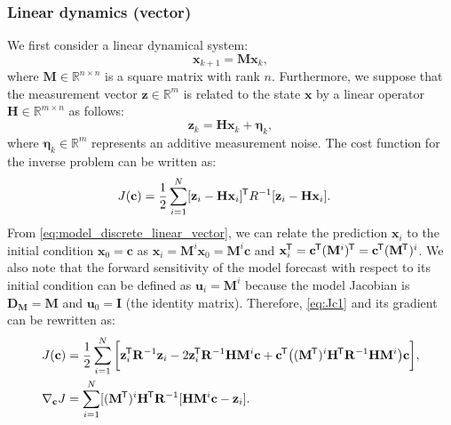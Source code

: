 \documentclass{article}
\newcommand*{\tran}{^{\mkern-1.5mu\mathsf{T}}}
\begin{document}
\subsubsection{Linear dynamics (vector)}
\textcolor{rev}{We first consider a linear dynamical system:
\begin{equation}
    \mathbf{x}_{k+1} = \mathbf{M} \mathbf{x}_k, \label{eq:model_discrete_linear_vector}
\end{equation}
where $\mathbf{M}\in \mathbb{R}^{n\times n}$ is a square matrix with rank $n$. Furthermore, we suppose that the measurement vector $\mathbf{z}\in \mathbb{R}^m$ is related to the state $\mathbf{x}$ by a linear operator $\mathbf{H}\in \mathbb{R}^{m\times n}$ as follows:
\begin{equation}
    \mathbf{z}_k = \mathbf{H} \mathbf{x}_k + \boldsymbol{\eta}_k,
\end{equation}
where $ \boldsymbol{\eta}_k \in \mathbb{R}^m$ represents an additive measurement noise. The cost function for the inverse problem can be written as:
\begin{equation}
    \begin{aligned}
        J(\mathbf{c}) &= \dfrac{1}{2} \sum_{i=1}^{N} [\mathbf{z}_i-\mathbf{H} \mathbf{x}_i]\tran R^{-1} [\mathbf{z}_i-\mathbf{H} \mathbf{x}_i].
    \end{aligned} \label{eq:Jc1}
\end{equation}
From \cref{eq:model_discrete_linear_vector}, we can relate the prediction $\mathbf{x}_i$ to the initial condition $\mathbf{x}_0=\mathbf{c}$ as $\mathbf{x}_i = \mathbf{M}^i \mathbf{x}_0= \mathbf{M}^i \mathbf{c}$ and $\mathbf{x}_i\tran =\mathbf{c}\tran (\mathbf{M}^i)\tran = \mathbf{c}\tran (\mathbf{M}\tran)^i$. We also note that the forward sensitivity of the model forecast with respect to its initial condition can be defined as $\mathbf{u}_i = \mathbf{M}^i$ because the model Jacobian is $\mathbf{D}_{\mathbf{M}}=\mathbf{M}$ and $\mathbf{u}_0=\mathbf{I}$ (the identity matrix). Therefore, \cref{eq:Jc1} and its gradient can be rewritten as:
\begin{align}
    J(\mathbf{c}) &= \dfrac{1}{2} \sum_{i=1}^{N} \bigg[\mathbf{z}_i\tran \mathbf{R}^{-1} \mathbf{z}_i - 2 \mathbf{z}_i\tran \mathbf{R}^{-1} \mathbf{H} \mathbf{M}^i \mathbf{c} + \mathbf{c}\tran \big((\mathbf{M}\tran)^i \mathbf{H}\tran \mathbf{R}^{-1}\mathbf{H} \mathbf{M}^i \big) \mathbf{c}\bigg], \\
    \nabla_{\mathbf{c}} J &= \sum_{i=1}^{N} [(\mathbf{M}\tran)^i \mathbf{H}\tran \mathbf{R}^{-1} [\mathbf{H} \mathbf{M}^i \mathbf{c} - \mathbf{z}_i]. \label{eq:gradJc1}

\end{align}}
\end{document}
